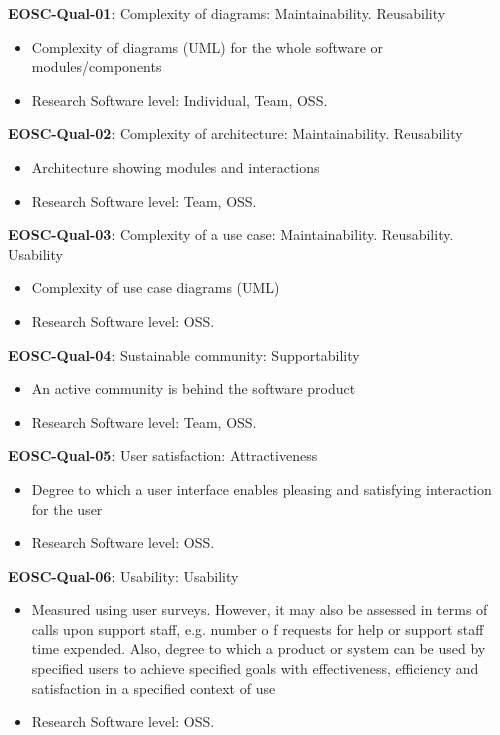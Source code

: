\textbf{EOSC-Qual-01}: Complexity of diagrams: Maintainability. Reusability

\begin{itemize}
    \item Complexity of diagrams (UML) for the whole software or modules/components \cite{montagud_systematic_2012}
    \item Research Software level: Individual, Team, OSS.
\end{itemize}

\textbf{EOSC-Qual-02}: Complexity of architecture: Maintainability. Reusability

\begin{itemize}
    \item Architecture showing modules and interactions \cite{montagud_systematic_2012,zuser_software_2005}
    \item Research Software level: Team, OSS.
\end{itemize}

\textbf{EOSC-Qual-03}: Complexity of a use case: Maintainability. Reusability. Usability

\begin{itemize}
    \item Complexity of use case diagrams (UML) \cite{montagud_systematic_2012}
    \item Research Software level: OSS.
\end{itemize}

\textbf{EOSC-Qual-04}: Sustainable community: Supportability

\begin{itemize}
    \item An active community is behind the software product \cite{aberdour_achieving_2007}
    \item Research Software level: Team, OSS.
\end{itemize}

\textbf{EOSC-Qual-05}: User satisfaction: Attractiveness

\begin{itemize}
    \item Degree to which a user interface enables pleasing and satisfying interaction for the user \cite{iso_25010_2011_2017,zuser_software_2005}
    \item Research Software level: OSS.
\end{itemize}

\textbf{EOSC-Qual-06}: Usability: Usability

\begin{itemize}
    \item Measured using user surveys. However, it may also be assessed in terms of calls upon support staff, e.g. number o f requests for help or support staff time expended. Also, degree to which a product or system can be used by specified users to achieve specified goals with
effectiveness, efficiency and satisfaction in a specified context of use \cite{iso_25010_2011_2017,zuser_software_2005,gillies_modelling_1992,boehm_quantitative_1976}
    \item Research Software level: OSS.
\end{itemize}

